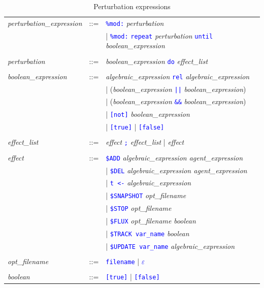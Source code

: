 \documentclass[11pt]{book}
\def\tcb#1{\textcolor{blue}{\ttt{#1}}}
\def\ttt#1{\texttt{#1}}
\def\var#1{\textquotesingle #1\textquotesingle}
\begin{document}
\begin{table}[htbp]
  \centering
  \caption{Perturbation expressions}
  \begin{tabular}{@{} lcl @{}}
  	\textit{perturbation\_expression} &::=& \tcb{\ttt{\%mod:}} \textit{perturbation} \\
	&& | \tcb{\ttt{\%mod:}} \tcb{\ttt{repeat}} \textit{perturbation} \tcb{\ttt{until}} \textit{boolean\_expression} \\\\ 
    
    \textit{perturbation} &::=& \textit{boolean\_expression} \tcb{\ttt{do}} \textit{effect\_list} \\\\
    \textit{boolean\_expression} &::=& \textit{algebraic\_expression}\index{boolean expression} \tcb{rel} \textit{algebraic\_expression} \\
    && | (\textit{boolean\_expression} \tcb{||} \textit{boolean\_expression}) \\
    && | (\textit{boolean\_expression} \tcb{\&\&} \textit{boolean\_expression}) \\
    && | \tcb{[not]} \textit{boolean\_expression} \\
    && | \tcb{[true]} | \tcb{[false]} \\\\
    \textit{effect\_list} &::=& \textit{effect} \tcb{\ttt {;}} \textit{effect\_list} | \textit{effect} \\\\
\textit{effect} &::=& \tcb{\$ADD} \textit{algebraic\_expression agent\_expression} \\
    && | \tcb{\$DEL} \textit{algebraic\_expression agent\_expression} \\
    && | \tcb{t <-} \textit{algebraic\_expression} \\
    && | \tcb{\$SNAPSHOT} \textit{opt\_filename}\\ 
    && | \tcb{\$STOP} \textit{opt\_filename}\\
	&& | \tcb{\$FLUX} \textit{opt\_filename} \textit{boolean} \\
    && | \tcb{\$TRACK \var{var\_name}} \textit{boolean} \\
    && | \tcb{\$UPDATE \var{var\_name}} \textit{algebraic\_expression} \\\\
    \textit{opt\_filename} &::=& \tcb{\var{\var{filename}}} | \tcb{$\varepsilon$} \\\\
	\textit{boolean} &::=& \tcb{[true]} | \tcb{[false]}
  \end{tabular}
  \label{tab:pert}
\end{table}
\end{document}
